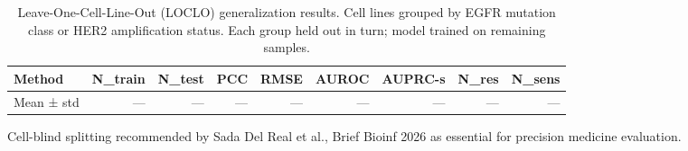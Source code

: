 \begin{table}[htbp]
\centering
\caption{Leave-One-Cell-Line-Out (LOCLO) generalization results. Cell lines grouped by EGFR mutation class or HER2 amplification status. Each group held out in turn; model trained on remaining samples.}
\label{tab:s3_loclo}
\small
\begin{tabular}{lrrrrrrrr}
\toprule
\textbf{Method} & \textbf{N_train} & \textbf{N_test} & \textbf{PCC} & \textbf{RMSE} & \textbf{AUROC} & \textbf{AUPRC-s} & \textbf{N_res} & \textbf{N_sens} \\
\midrule
Mean ± std & — & — & — & — & — & — & — & — \\
\bottomrule
\end{tabular}
\vspace{2pt}
\begin{minipage}{\textwidth}
\footnotesize Cell-blind splitting recommended by Sada Del Real et al., Brief Bioinf 2026 as essential for precision medicine evaluation.
\end{minipage}
\end{table}